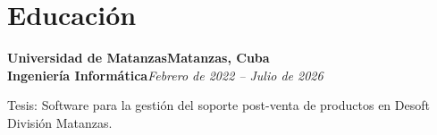 \section{Educación}

\vspace{7pt}
\textbf{Universidad de Matanzas}\hfill\textbf{Matanzas, Cuba}\\
\textbf{Ingeniería Informática}\hfill\textit{Febrero de 2022 – Julio de 2026}\par

Tesis: Software para la gestión del soporte \mbox{post-venta} de productos en Desoft División Matanzas.

